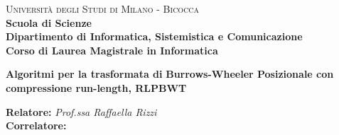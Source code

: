 \documentclass[a4paper,12pt, oneside]{book}
\begin{document}
{} 
\begin{titlepage}
  

  \noindent
  \begin{minipage}[t]{0.19\textwidth}
  \end{minipage}
  \begin{minipage}[t]{0.81\textwidth}
    {
      {\textsc{Università degli Studi di Milano - Bicocca}} \\
      \textbf{Scuola di Scienze} \\
      \textbf{Dipartimento di Informatica, Sistemistica e Comunicazione} \\
      \textbf{Corso di Laurea Magistrale in Informatica} \\
      \par
    }
  \end{minipage}
  
  \vspace{40mm}
  
  \begin{center}
    {\LARGE{
        \textbf{Algoritmi per la trasformata di}}}
     \vspace{1mm}
    {\LARGE{
        \textbf{Burrows-Wheeler Posizionale con}}}
    \vspace{1mm}
    {\LARGE{
        \textbf{compressione run-length, RLPBWT}}}
    
  \end{center}
  
  \vspace{48mm}

  \noindent
  {\large \textbf{Relatore:} \textit{Prof.ssa Raffaella Rizzi}} \\

  \noindent
  {\large \textbf{Correlatore:} \textit{}}
  

\end{titlepage}
\end{document}
